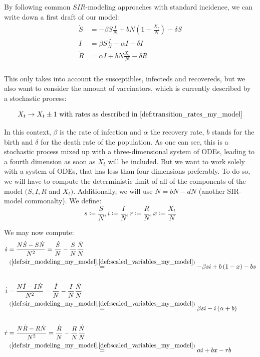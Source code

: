 \documentclass[12pt,a4paper,twoside]{article}
\begin{document}
By following common $SIR$-modeling approaches with standard incidence, we can write down a first draft of our model:
\begin{align}\label{def:sir_modeling_my_model}
\begin{split}
\dot{S} &= -\beta S\frac{I}{N} + bN\left(1-\frac{X_t}{N}\right) - \delta S\\
\dot{I} &= \beta S\frac{I}{N}  - \alpha I - \delta I\\
\dot{R} &= \alpha I + bN\frac{X_t}{N} - \delta R\\
\end{split}
\end{align}

This only takes into account the susceptibles, infecteds and recovereds, but we also want to consider the amount of vaccinators, which is currently described by a stochastic process:

\begin{equation*}
	X_t \rightarrow X_t \pm 1\textnormal{ with rates as described in \eqref{def:transition_rates_my_model}}
\end{equation*}

In this context, $\beta$ is the rate of infection and $\alpha$ the recovery rate, $b$ stands for the birth and $\delta$ for the death rate of the population. As one can see, this is a stochastic process mixed up with a three-dimensional system of \acp{ODE}, leading to a fourth dimension as soon as $X_t$ will be included. But we want to work solely with a system of \acp{ODE}, that has less than four dimensions preferably. To do so, we will have to compute the deterministic limit of all of the components of the model $(S,I, R$ and $X_t)$. Additionally, we will use $\dot{N} = bN - dN$ (another SIR-model commonalty). We define:
\begin{equation}\label{def:scaled_variables_my_model}
s\coloneqq \frac{S}{N}, i\coloneqq \frac{I}{N}, r\coloneqq \frac{R}{N}, x\coloneqq \frac{X_t}{N}
\end{equation}

We may now compute:
\begin{align*}
\dot{s} &= \frac{N\dot{S}-S\dot{N}}{N^2} = \frac{\dot{S}}{N} - \frac{S}{N}\frac{\dot{N}}{N}\\
&\overset{(\ref{def:sir_modeling_my_model}, \ref{def:scaled_variables_my_model})}{=} -\beta si + b\left(1-x\right) - bs\\
&\\
\dot{i} &= \frac{N\dot{I}-I\dot{N}}{N^2} = \frac{\dot{I}}{N} - \frac{I}{N}\frac{\dot{N}}{N}\\
&\overset{(\ref{def:sir_modeling_my_model}, \ref{def:scaled_variables_my_model})}{=} \beta si - i\left(\alpha + b\right)\\
&\\
\dot{r} &= \frac{N\dot{R}-R\dot{N}}{N^2} = \frac{\dot{R}}{N} - \frac{R}{N}\frac{\dot{N}}{N}\\
&\overset{(\ref{def:sir_modeling_my_model}, \ref{def:scaled_variables_my_model})}{=} \alpha i + bx - rb
\end{align*}
\end{document}
